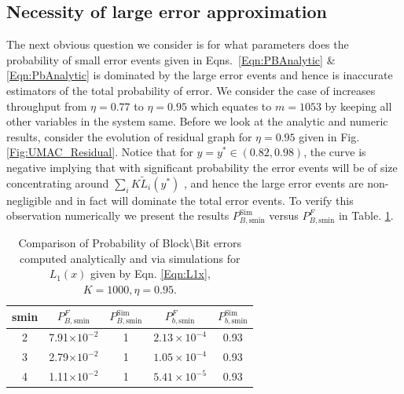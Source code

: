 
\subsection{Necessity of large error approximation}
The next obvious question we consider is for what parameters does the probability of small error events given in Eqns.~\eqref{Eqn:PBAnalytic} \& \eqref{Eqn:PbAnalytic} is dominated by the large error events and hence is inaccurate estimators of the total probability of error.  We consider the case of increases throughput from $\eta=0.77$ to $\eta=0.95$ which equates to $m=1053$ by keeping all other variables in the system same. Before we look at the analytic and numeric results, consider the evolution of residual graph for $\eta=0.95$ given in Fig. \ref{Fig:UMAC_Residual}. Notice that for $y=y^*\in(0.82,0.98)$, the curve is negative implying that with significant probability the error events will be of size concentrating around $\sum_{i}K\tilde{L}_{i}(y^*)$ , and hence the large error events are non-negligible and in fact will dominate the total error events. To verify this observation numerically we present the results  $P_{B,\text{smin}}^{\text{Sim}}$ versus $P_{B,\text{smin}}^F$ in Table. \ref{Table:SimvsAnalytic3}.
%

\begin{table}[!ht]
\centering
\begin{tabular}{c c c c c}
\hline  \hline
smin & $P_{B,\text{smin}}^F$ & $P_{B,\text{smin}}^{\text{Sim}}$& $P_{b,\text{smin}}^{F}$ &$P_{b,\text{smin}}^{\text{Sim}}$\\
\hline
2 & 7.91$\times 10^{-2}$  & 1 & $2.13\times 10^{-4}$ &0.93\\
3 & 2.79$\times 10^{-2}$  & 1 & $1.05\times 10^{-4}$ &0.93\\
4 & 1.11$\times 10^{-2}$  & 1 & $5.41\times 10^{-5}$ &0.93\\
\end{tabular}
\caption{Comparison of Probability of Block\textbackslash Bit errors computed analytically and via simulations for $L_1(x)$ given by Eqn. \eqref{Eqn:L1x}, $K=1000, \eta=0.95$.}
\label{Table:SimvsAnalytic3}
\end{table}

